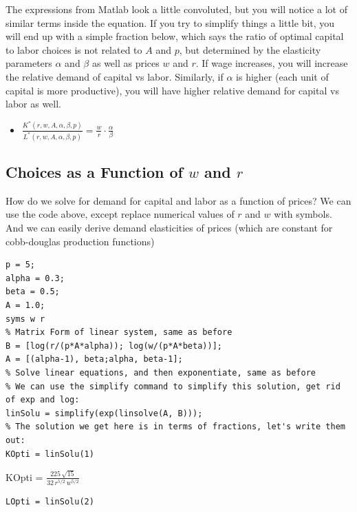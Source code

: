 \documentclass[
]{book}
\providecommand{\tightlist}{%
  \setlength{\itemsep}{0pt}\setlength{\parskip}{0pt}}
\begin{document}
The expressions from Matlab look a little convoluted, but you will
notice a lot of similar terms inside the equation. If you try to
simplify things a little bit, you will end up with a simple fraction
below, which says the ratio of optimal capital to labor choices is not
related to \(A\) and \(p\), but determined by the elasticity parameters
\(\alpha\) and \(\beta\) as well as prices \(w\) and \(r\). If wage increases,
you will increase the relative demand of capital vs labor. Similarly, if
\(\alpha\) is higher (each unit of capital is more productive), you will
have higher relative demand for capital vs labor as well.

\begin{itemize}
\tightlist
\item
  \(\displaystyle \frac{K^* (r,w,A,\alpha ,\beta ,p)}{L^* (r,w,A,\alpha ,\beta ,p)}=\frac{w}{r}\cdot \frac{\alpha }{\beta }\)
\end{itemize}

\hypertarget{choices-as-a-function-of-w-and-r}{%
\subsection{\texorpdfstring{Choices as a Function of \(w\) and \(r\)}{Choices as a Function of w and r}}\label{choices-as-a-function-of-w-and-r}}

How do we solve for demand for capital and labor as a function of
prices? We can use the code above, except replace numerical values of
\(r\) and \(w\) with symbols. And we can easily derive demand elasticities
of prices (which are constant for cobb-douglas production functions)

\begin{verbatim}
p = 5;
alpha = 0.3;
beta = 0.5;
A = 1.0;
syms w r
% Matrix Form of linear system, same as before
B = [log(r/(p*A*alpha)); log(w/(p*A*beta))];
A = [(alpha-1), beta;alpha, beta-1];
% Solve linear equations, and then exponentiate, same as before
% We can use the simplify command to simplify this solution, get rid of exp and log:
linSolu = simplify(exp(linsolve(A, B)));
% The solution we get here is in terms of fractions, let's write them out:
KOpti = linSolu(1)
\end{verbatim}

KOpti = \(\displaystyle \frac{225\,\sqrt{15}}{32\,r^{5/2} \,w^{5/2} }\)

\begin{verbatim}
LOpti = linSolu(2)
\end{verbatim}
\end{document}
